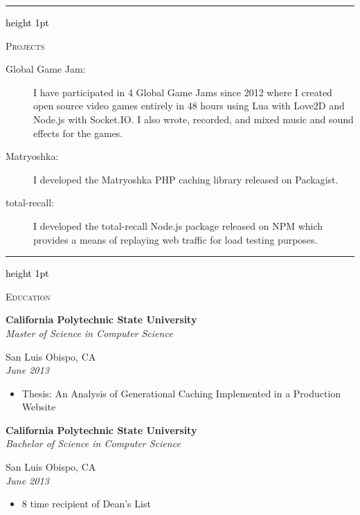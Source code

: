 \documentclass[letterpaper,10pt]{article}
\newcommand{\ressectiondivider}{
   \textcolor{black}{\hrule height 1pt}
}
\newcommand{\resitem}[1]{\item #1 \vspace{-2pt}}
\newcommand{\ressubheading}[4]{
   \begin{minipage}[t]{10cm}
      \flushleft
      \large{\textbf{#1}}\\
      \normalsize{\textit{#3}}\\
   \end{minipage}
   \hfill
   \begin{minipage}[t]{5cm}
      \flushright
      #2\\
      \textit{#4}\\
   \end{minipage}
}
\newenvironment{ressection}[1]{
   \vspace{12pt}
   \ressectiondivider
   \vspace{5pt}
   \begin{minipage}[t]{2.75cm}
      \flushleft
      \Large{\textrm{\textsc{#1}}}
   \end{minipage}
   \hfill
   \begin{minipage}[t]{16cm}
      \flushleft
}{
   \end{minipage}
}
\begin{document}
\begin{ressection}{Projects}
   \begin{description}
      \item[Global Game Jam:] I have participated in 4 Global Game Jams
         since 2012 where I created open source video games entirely in 48
         hours using Lua with Love2D and Node.js with Socket.IO. I also wrote,
         recorded, and mixed music and sound effects for the games.
      \item[Matryoshka:] I developed the Matryoshka PHP caching library released on Packagist.
      \item[total-recall:] I developed the total-recall Node.js package released on NPM which
         provides a means of replaying web traffic for load testing purposes.
   \end{description}
\end{ressection}

\begin{ressection}{Education}
   \ressubheading{California Polytechnic State University}{San Luis Obispo, CA}{Master of Science in Computer Science}{June 2013}
   \begin{itemize}
      \resitem{Thesis: An Analysis of Generational Caching Implemented in a Production Website}
   \end{itemize}
   \ressubheading{California Polytechnic State University}{San Luis Obispo, CA}{Bachelor of Science in Computer Science}{June 2013}
   \begin{itemize}
      \resitem{8 time recipient of Dean's List}
   \end{itemize}
\end{ressection}
\end{document}
